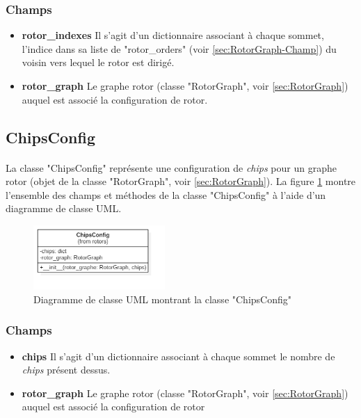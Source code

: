\documentclass{article}
\begin{document}
			\subsubsection{Champs}
				\begin{itemize}	
					\item \textbf{rotor\_indexes}\newline
					Il s'agit d'un dictionnaire associant à chaque sommet, l'indice dans sa liste de "rotor\_orders" (voir \ref{sec:RotorGraph-Champ}) du voisin vers lequel le rotor est dirigé.
					\item \textbf{rotor\_graph}\newline
					Le graphe rotor (classe "RotorGraph", voir \ref{sec:RotorGraph}) auquel est associé la configuration de rotor.
				\end{itemize}
	
		\subsection{ChipsConfig}
			\paragraph*{}
			La classe "ChipsConfig" représente une configuration de \textit{chips} pour un graphe rotor (objet de la classe "RotorGraph", voir \ref{sec:RotorGraph}). La figure \ref{fig:diagClassChipsConfig} montre l'ensemble des champs et méthodes de la classe "ChipsConfig" à l'aide d'un diagramme de classe UML.
			
			\begin{figure}[h]
				\includegraphics[width=5cm]{diagClassChipsConfig.png}
				\centering
				\caption{Diagramme de classe UML montrant la classe "ChipsConfig"}
				\label{fig:diagClassChipsConfig}
			\end{figure}
		
			\subsubsection{Champs}
				\begin{itemize}
					\item \textbf{chips}\newline
					Il s'agit d'un dictionnaire associant à chaque sommet le nombre de \textit{chips} présent dessus.
					\item \textbf{rotor\_graph}\newline
					Le graphe rotor (classe "RotorGraph", voir \ref{sec:RotorGraph}) auquel est associé la configuration de rotor
				\end{itemize}
		
\end{document}
